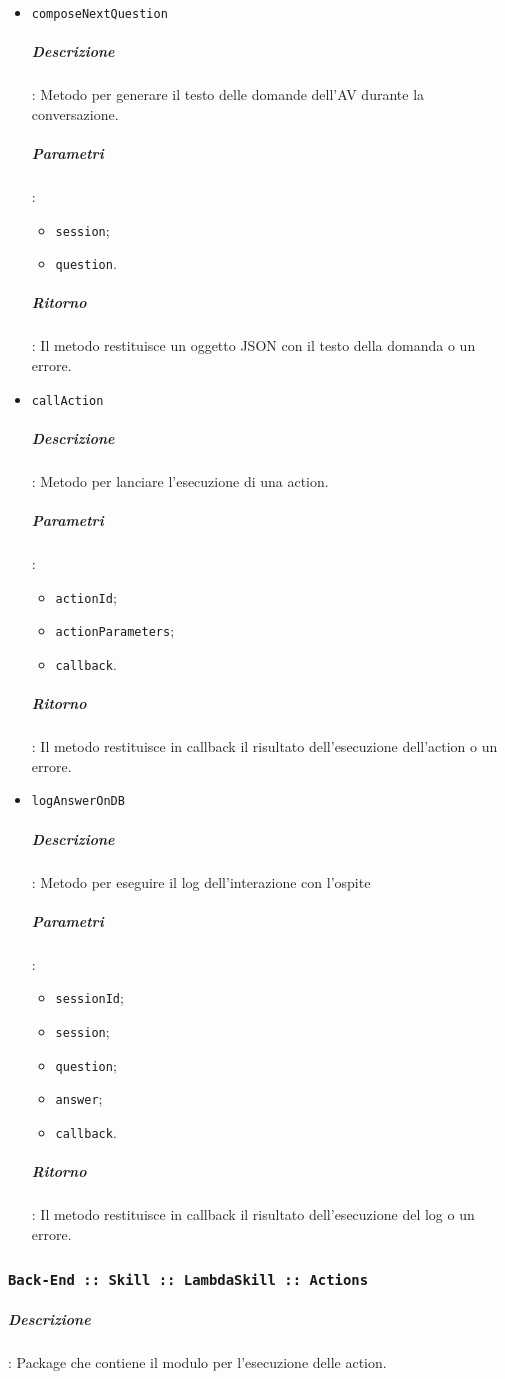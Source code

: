 \documentclass[../DefinizioneDiProdotto_v2.0.0.tex]{subfiles}
\begin{document}
\begin{itemize}
	\item \texttt{composeNextQuestion}
	      \subparagraph{Descrizione}: Metodo per generare il testo delle domande dell'AV durante la conversazione.
	      \subparagraph{Parametri}:
	      \begin{itemize}
	      	\item \texttt{session};
	      	\item \texttt{question}.
	      \end{itemize}
	      \subparagraph{Ritorno}: Il metodo restituisce un oggetto JSON con il testo della domanda o un errore.

	\item \texttt{callAction}
	      \subparagraph{Descrizione}: Metodo per lanciare l'esecuzione di una action.
	      \subparagraph{Parametri}:
	      \begin{itemize}
	      	\item \texttt{actionId};
	      	\item \texttt{actionParameters};
	      	\item \texttt{callback}.
	      \end{itemize}
	      \subparagraph{Ritorno}: Il metodo restituisce in callback il risultato dell'esecuzione dell'action o un errore.

	\item \texttt{logAnswerOnDB}
	      \subparagraph{Descrizione}: Metodo per eseguire il log dell'interazione con l'ospite
	      \subparagraph{Parametri}:
	      \begin{itemize}
	      	\item \texttt{sessionId};
	      	\item \texttt{session};
	      	\item \texttt{question};
	      	\item \texttt{answer};
	      	\item \texttt{callback}.
	      \end{itemize}
	      \subparagraph{Ritorno}: Il metodo restituisce in callback il risultato dell'esecuzione del log o un errore.

\end{itemize}

\subsubsection{\texttt{Back-End :: Skill :: LambdaSkill :: Actions}}
\subparagraph{Descrizione}: Package che contiene il modulo per l'esecuzione delle action.
\end{document}
